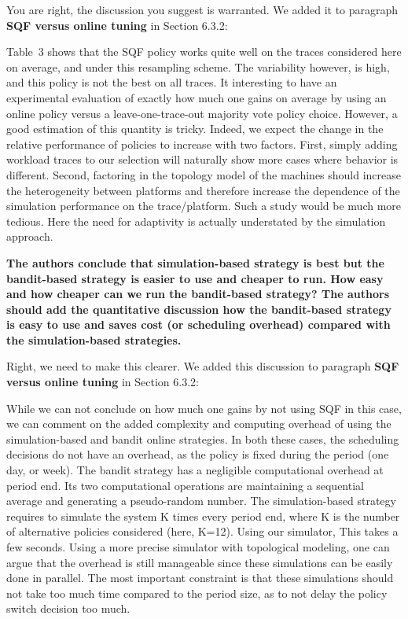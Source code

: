 \documentclass[]{article}
\begin{document}
You are right, the discussion you suggest is warranted. We added it to
paragraph \textbf{SQF versus online tuning} in Section 6.3.2:

\begin{displayquote}
Table~3 shows that the SQF policy
works quite well on the traces considered here on average, and under this
resampling scheme. The variability however, is high, and this policy is not the
best on all traces. It interesting to have an experimental evaluation of
exactly how much one gains on average by using an online policy versus a
leave-one-trace-out majority vote policy choice.  However, a good estimation of
this quantity is tricky. Indeed, we expect the change in the relative
performance of policies to increase with two factors. First, simply adding
workload traces to our selection will naturally show more cases where behavior
is different. Second, factoring in the topology model of the machines should
increase the heterogeneity between platforms and therefore increase the
dependence of the simulation performance on the trace/platform. Such a study
would be much more tedious. Here the need for adaptivity is actually
understated by the simulation approach.
\end{displayquote}

\medskip

\textbf{The authors conclude that simulation-based strategy is best but the bandit-based strategy is easier to use and cheaper
to run. How easy and how cheaper can we run the bandit-based strategy? The authors should add the quantitative
discussion how the bandit-based strategy is easy to use and saves cost (or scheduling overhead) compared with the
simulation-based strategies.
}

Right, we need to make this clearer. We added this discussion to paragraph
\textbf{SQF versus online tuning} in Section 6.3.2:

\begin{displayquote}
While we can not conclude on how much one gains by not using SQF in this case,
we can comment on the added complexity and computing overhead of using the
simulation-based and bandit online strategies. In both these cases, the
scheduling decisions do not have an overhead, as the policy is fixed during the
period (one day, or week). The bandit strategy has a negligible computational
overhead at period end. Its two computational operations are maintaining a
sequential average and generating a pseudo-random number.  The simulation-based
strategy requires to simulate the system K times every period end, where K is
the number of alternative policies considered (here, K=12). Using our
simulator, This takes a few seconds. Using a more precise simulator with
topological modeling, one can argue that the overhead is still manageable since
these simulations can be easily done in parallel. The most important constraint
is that these simulations should not take too much time compared to the period
size, as to not delay the policy switch decision too much.
\end{displayquote}

\medskip



\end{document}
